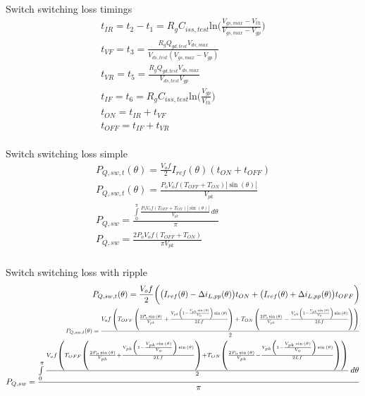 \documentclass[12pt]{report}
\begin{document}
Switch switching loss timings
\begin{align}
t_{IR} = t_{2} - t_{1} = R_{g}C_{iss,test}\text{ln}\bigg(\frac{V_{gs,max}-V_{th}}{V_{gs,max}-V_{gp}}\bigg)\\
t_{VF} = t_{3} = \frac{R_{g}Q_{gd,test}V_{ds,max}}{V_{ds,test}(V_{gs,max} - V_{gp})}\\
t_{VR} = t_{5} = \frac{R_{g}Q_{gd,test}V_{ds,max}}{V_{ds,test}V_{gp}}\\
t_{IF} = t_{6} = R_{g}C_{iss,test}\text{ln}\bigg(\frac{V_{gp}}{V_{th}}\bigg)\\
t_{ON} = t_{IR} + t_{VF}\\
t_{OFF} = t_{IF} + t_{VR}\\
\end{align}

Switch switching loss simple
\begin{align}
P_{Q,sw,t}(\theta) = \frac{V_{o}f}{2}I_{ref}(\theta)(t_{ON} + t_{OFF})\\
P_{Q,sw,t}(\theta) = \frac{P_{o} V_{o} f \left(T_{OFF} + T_{ON}\right) \left|{\sin{\left(\theta \right)}}\right|}{V_{pk}}\\
P_{Q,sw} = \frac{\int\limits_{0}^{\pi} \frac{P_{o} V_{o} f \left(T_{OFF} + T_{ON}\right) \left|{\sin{\left(\theta \right)}}\right|}{V_{pk}}\, d\theta}{\pi}\\
P_{Q,sw} = \frac{2 P_{o} V_{o} f \left(T_{OFF} + T_{ON}\right)}{\pi V_{pk}}\\
\end{align}

Switch switching loss with ripple
\begin{align}
P_{Q,sw,t}(\theta) = \frac{V_{o}f}{2}\bigg(\big(I_{ref}(\theta)-\Delta i_{L,pp}(\theta)\big)t_{ON} + \big(I_{ref}(\theta)+\Delta i_{L,pp}(\theta)\big)t_{OFF}\bigg)\\
\text{\scalebox{0.75}{$P_{Q,sw,t}(\theta) = \frac{V_{o} f \left(T_{OFF} \left(\frac{2 P_{o} \sin{\left(\theta \right)}}{V_{pk}} + \frac{V_{pk} \left(1 - \frac{V_{pk} \sin{\left(\theta \right)}}{V_{o}}\right) \sin{\left(\theta \right)}}{2 L f}\right) + T_{ON} \left(\frac{2 P_{o} \sin{\left(\theta \right)}}{V_{pk}} - \frac{V_{pk} \left(1 - \frac{V_{pk} \sin{\left(\theta \right)}}{V_{o}}\right) \sin{\left(\theta \right)}}{2 L f}\right)\right)}{2}$}}\\
P_{Q,sw} = \frac{\int\limits_{0}^{\pi} \frac{V_{o} f \left(T_{OFF} \left(\frac{2 P_{o} \sin{\left(\theta \right)}}{V_{pk}} + \frac{V_{pk} \left(1 - \frac{V_{pk} \sin{\left(\theta \right)}}{V_{o}}\right) \sin{\left(\theta \right)}}{2 L f}\right) + T_{ON} \left(\frac{2 P_{o} \sin{\left(\theta \right)}}{V_{pk}} - \frac{V_{pk} \left(1 - \frac{V_{pk} \sin{\left(\theta \right)}}{V_{o}}\right) \sin{\left(\theta \right)}}{2 L f}\right)\right)}{2}\, d\theta}{\pi}\\
\end{align}
\end{document}
